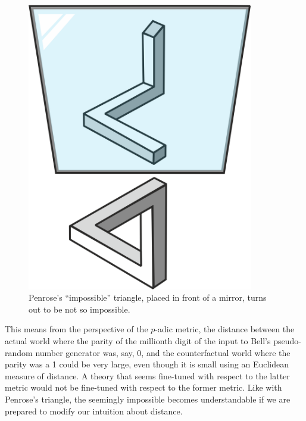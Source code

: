 \documentclass[12pt]{article}
\begin{document}

\newpage
\begin{figure}
  \begin{center}
    \includegraphics[width=0.88\textwidth]{triangle.png}
  \end{center}
  {\caption{Penrose's ``impossible'' triangle, placed in front of a mirror, turns out to be not so impossible. \label{fig1} }}
\end{figure}




This means from the perspective of the $p$-adic metric, the distance between the actual world where the parity of the millionth digit of the input to Bell's pseudo-random number generator was, say, 0, and the counterfactual world where the parity was a 1 could be very large, even though it is small using an Euclidean measure of distance. A theory that seems fine-tuned with respect to the latter metric would not be fine-tuned with respect to the former metric. Like with Penrose's triangle, the seemingly impossible becomes understandable if we are prepared to modify our intuition about distance. 
\end{document}
